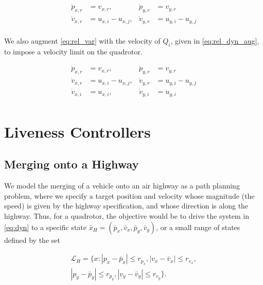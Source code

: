 \begin{equation}
\begin{aligned}
\dot{p}_{x,r}& = v_{x,r}, &\dot{p}_{y,r} &= v_{y,r} \\
\dot{v}_{x,r}& = u_{x,i} - u_{x,j}, &\dot{v}_{y,r} &= u_{y,i} - u_{y,j}\\
\end{aligned}
\end{equation}

We also augment \eqref{eq:rel_var} with the velocity of $Q_i$, given in \eqref{eq:rel_dyn_aug}, to impose a velocity limit on the quadrotor.

\begin{equation} \label{eq:rel_dyn_aug}
\begin{aligned}
\dot{p}_{x,r} &= v_{x,r}, &\dot{p}_{y,r} &= v_{y,r} \\
\dot{v}_{x,r} &= u_{x,i} - u_{x,j}, &\dot{v}_{y,r}&= u_{y,i} - u_{y,j}\\
\dot{v}_{x,i} &= u_{x,i}, &\dot{v}_{y,i} &= u_{y,i} \\
\end{aligned}
\end{equation}

\section{Liveness Controllers \label{sec:liveness}}
\subsection{Merging onto a Highway \label{subsec:highway_merge}}
We model the merging of a vehicle onto an air highway as a path planning problem, where we specify a target position and velocity whose magnitude (the speed) is given by the highway specification, and whose direction is along the highway. Thus, for a quadrotor, the objective would be to drive the system in \eqref{eq:dyn} to a specific state $\bar{x}_H=(\bar{p}_x, \bar{v}_x, \bar{p}_y, \bar{v}_y)$, or a small range of states defined by the set

\begin{equation}
\begin{aligned}
\mathcal{L}_H = \{x: |p_x-\bar{p}_x|\le r_{p_x}, |v_x-\bar{v}_x|\le r_{v_x}, \\
|p_y - \bar{p}_y| \le r_{p_y}, |v_y - \bar{v}_y|\le r_{v_y} \}.
\end{aligned}
\end{equation}

